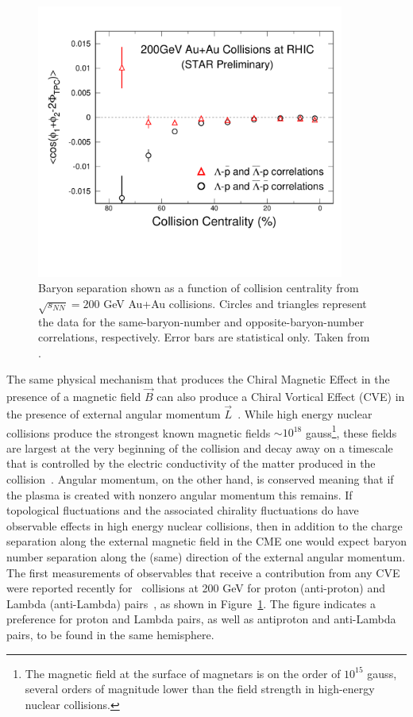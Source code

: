 \begin{figure}[!htp]
\includegraphics*[width=0.9\textwidth]{fig/CVEfromSTAR}
\vspace{-1.5cm}
\caption[Baryon separation as a function of collision centrality from STAR]{Baryon separation shown as a function of collision centrality
  from $\sqrt{s_{NN}}=200$ GeV Au+Au collisions. Circles and triangles
  represent the data for the same-baryon-number and
  opposite-baryon-number correlations, respectively.  Error bars are
  statistical only. Taken from \cite{Zhao:2014aja}.}
\label{Fig:CVE}
\end{figure}
The same physical mechanism that produces the Chiral Magnetic Effect
in the presence of a magnetic field $\vec B$ can also produce a Chiral
Vortical Effect (CVE) in the presence of external angular momentum
$\vec L$~\cite{Kharzeev:2010gr}.  While high energy nuclear collisions
produce the strongest known magnetic fields $\sim 10^{18}$
gauss\footnote{The magnetic field at the surface of magnetars is on
  the order of $10^{15}$ gauss, several orders of magnitude lower than
  the field strength in high-energy nuclear collisions.}, these fields
are largest at the very beginning of the collision and decay away on a
timescale that is controlled by the electric conductivity of the
matter produced in the
collision~\cite{Tuchin:2013ie,McLerran:2013hla,Gursoy:2014aka}.
Angular momentum, on the other hand, is conserved meaning that if the
plasma is created with nonzero angular momentum this remains.  If
topological fluctuations and the associated chirality fluctuations do
have observable effects in high energy nuclear collisions, then in
addition to the charge separation along the external magnetic field in
the CME one would expect baryon number separation along the (same)
direction of the external angular momentum.  The first measurements of
observables that receive a contribution from any CVE were reported
recently for \AuAu\ collisions at 200 GeV for proton (anti-proton) and
Lambda (anti-Lambda) pairs~\cite{Zhao:2014aja}, as shown in
Figure~\ref{Fig:CVE}.  The figure indicates a preference for proton
and Lambda pairs, as well as antiproton and anti-Lambda pairs, to be
found in the same hemisphere.

